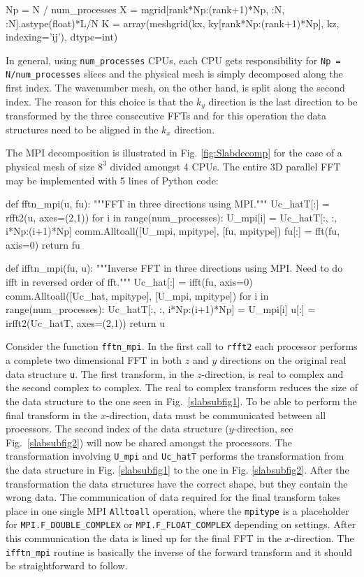 \documentclass[11pt, oneside]{article}
\newcommand{\inpyth}{\lstinline[style=pythonstyle, basicstyle=\ttfamily]} %[]%
\begin{document}
\begin{python}
Np = N / num_processes
X = mgrid[rank*Np:(rank+1)*Np, :N, :N].astype(float)*L/N
K = array(meshgrid(kx, ky[rank*Np:(rank+1)*Np], kz, 
                   indexing='ij'), dtype=int)
\end{python}
In general, using \inpyth{num_processes} CPUs, each CPU gets responsibility for \inpyth{Np = N/num_processes} slices and the physical mesh is simply decomposed along the first index. The wavenumber mesh, on the other hand, is split along the second index. The reason for this choice is that the $k_y$ direction is the last direction to be transformed by the three consecutive FFTs and for this operation the data structures need to be aligned in the $k_x$ direction.

The MPI decomposition is illustrated in Fig. \ref{fig:Slabdecomp} for the case of a physical mesh of size $8^3$ divided amongst 4 CPUs. The entire 3D parallel FFT may be implemented with 5 lines of Python code:

\begin{python}
def fftn_mpi(u, fu):
    """FFT in three directions using MPI."""
    Uc_hatT[:] = rfft2(u, axes=(2,1))
    for i in range(num_processes):
        U_mpi[i] = Uc_hatT[:, :, i*Np:(i+1)*Np]
    comm.Alltoall([U_mpi, mpitype], [fu, mpitype])
    fu[:] = fft(fu, axis=0)
    return fu

def ifftn_mpi(fu, u):
    """Inverse FFT in three directions using MPI.
       Need to do ifft in reversed order of fft."""
    Uc_hat[:] = ifft(fu, axis=0)
    comm.Alltoall([Uc_hat, mpitype], [U_mpi, mpitype])
    for i in range(num_processes):
        Uc_hatT[:, :, i*Np:(i+1)*Np] = U_mpi[i]
    u[:] = irfft2(Uc_hatT, axes=(2,1))
    return u
\end{python}
Consider the function \inpyth{fftn_mpi}. In the first call to \inpyth{rfft2} each processor performs a complete two dimensional FFT in both $z$ and $y$ directions on the original real data structure \inpyth{u}. The first transform, in the $z$-direction, is real to complex and the second complex to complex. The real to complex transform reduces the size of the data structure to the one seen in Fig.~\ref{slabsubfig1}. To be able to perform the final transform in the $x$-direction, data must be communicated between all processors. The second index of the data structure ($y$-direction, see Fig.~\ref{slabsubfig2}) will now be shared amongst the processors. The transformation involving \inpyth{U_mpi} and \inpyth{Uc_hatT} performs the transformation from the data structure in Fig. \ref{slabsubfig1} to the one in Fig. \ref{slabsubfig2}. After the transformation the data structures have the correct shape, but they contain the wrong data. The communication of data required for the final transform takes place in one single MPI \inpyth{Alltoall} operation, where the \inpyth{mpitype} is a placeholder for \inpyth{MPI.F_DOUBLE_COMPLEX} or \inpyth{MPI.F_FLOAT_COMPLEX} depending on settings. After this communication the data is lined up for the final FFT in the $x$-direction. The \inpyth{ifftn_mpi} routine is basically the inverse of the forward transform and it should be straightforward to follow.
\end{document}

